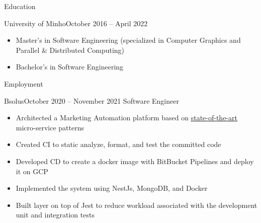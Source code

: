 \documentclass[]{mcdowellcv}
\begin{document}
	\makeheader
    
    \begin{cvsection}{Education}
		\begin{cvsubsection}{University of Minho}{}{October 2016 -- April 2022}
			\begin{itemize}
                \item Master’s in Software Engineering (specialized in Computer Graphics and Parallel \& Distributed Computing)
                \item Bachelor's in Software Engineering
			\end{itemize}
		\end{cvsubsection}
	\end{cvsection}
 
	\begin{cvsection}{Employment}
		\begin{cvsubsection}{Bsolus}{}{October 2020 -- November 2021}
			Software Engineer
			\begin{itemize}
                \item Architected a Marketing Automation platform based on \href{https://repositorium.sdum.uminho.pt/handle/1822/80045}{\underline{state-of-the-art}} micro-service patterns
                \item Created CI to static analyze, format, and test the committed code
                \item Developed CD to create a docker image with BitBucket Pipelines and deploy it on GCP
                \item Implemented the system using NestJs, MongoDB, and Docker      
                \item Built layer on top of Jest to reduce workload associated with the development unit and integration tests
			\end{itemize}
		\end{cvsubsection}
	\end{cvsection}
\end{document}
